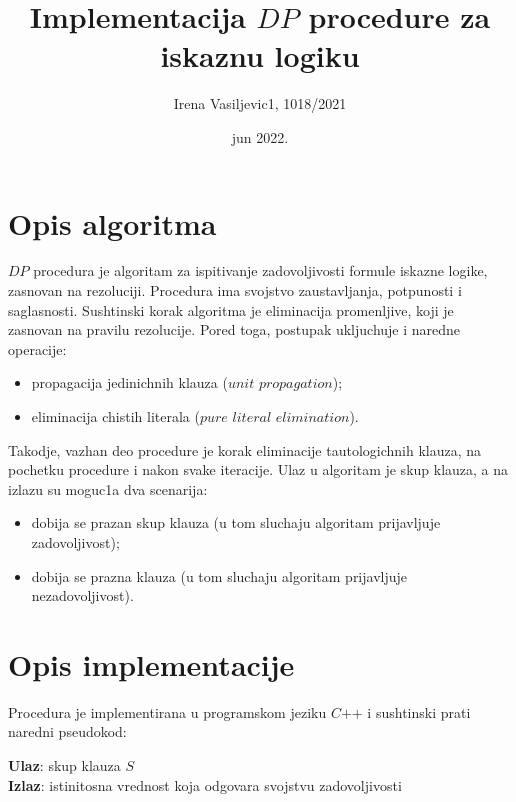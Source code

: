 \documentclass[a4paper,titlepage,12pt]{article}
\title{Implementacija $DP$ procedure za iskaznu logiku}
\author{Irena Vasiljevic1, 1018/2021}
\date{jun 2022.}
\begin{document}
\maketitle

\section{Opis algoritma}

$DP$ procedura je algoritam za ispitivanje zadovoljivosti formule iskazne logike, zasnovan na rezoluciji. Procedura ima svojstvo zaustavljanja, potpunosti i saglasnosti. Sushtinski korak algoritma je eliminacija promenljive, koji je zasnovan na pravilu rezolucije. Pored toga, postupak ukljuchuje i naredne operacije:
\begin{itemize}
	\item propagacija jedinichnih klauza ($unit$ $propagation$);
	\item eliminacija chistih literala ($pure$ $literal$ $elimination$).
\end{itemize}
Takodje, vazhan deo procedure je korak eliminacije tautologichnih klauza, na pochetku procedure i nakon svake iteracije. Ulaz u algoritam je skup klauza, a na izlazu su moguc1a dva scenarija:
\begin{itemize}
	\item dobija se prazan skup klauza (u tom sluchaju algoritam prijavljuje zadovoljivost);
	\item dobija se prazna klauza (u tom sluchaju algoritam prijavljuje nezadovoljivost).
\end{itemize}

\section{Opis implementacije}

Procedura je implementirana u programskom jeziku $C$$+$$+$ i sushtinski prati naredni pseudokod:\\

\newpage

\noindent \textbf{Ulaz}: skup klauza $S$\\
\textbf{Izlaz}: istinitosna vrednost koja odgovara svojstvu zadovoljivosti\\
\end{document}
